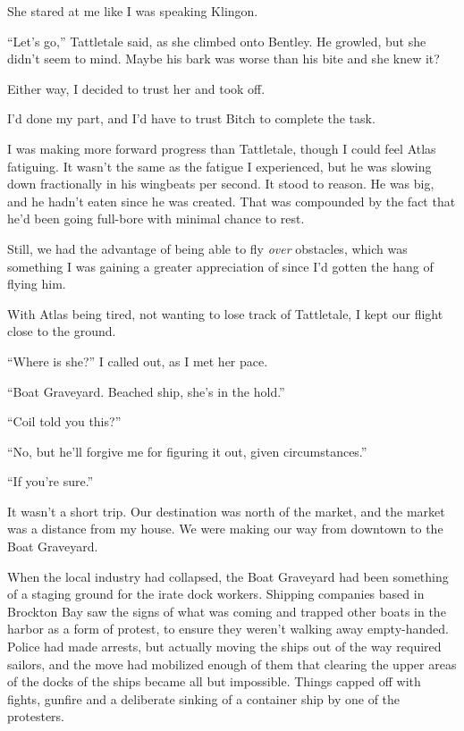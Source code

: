 She stared at me like I was speaking Klingon.



``Let's go,'' Tattletale said, as she climbed onto Bentley.  He growled, but she didn't seem to mind.  Maybe his bark was worse than his bite and she knew it?



Either way, I decided to trust her and took off.



I'd done my part, and I'd have to trust Bitch to complete the task.



I was making more forward progress than Tattletale, though I could feel Atlas fatiguing.  It wasn't the same as the fatigue I experienced, but he was slowing down fractionally in his wingbeats per second.  It stood to reason.  He was big, and he hadn't eaten since he was created.  That was compounded by the fact that he'd been going full-bore with minimal chance to rest.



Still, we had the advantage of being able to fly \emph{over} obstacles, which was something I was gaining a greater appreciation of since I'd gotten the hang of flying him.



With Atlas being tired, not wanting to lose track of Tattletale, I kept our flight close to the ground.



``Where is she?'' I called out, as I met her pace.



``Boat Graveyard.  Beached ship, she's in the hold.''



``Coil told you this?''



``No, but he'll forgive me for figuring it out, given circumstances.''



``If you're sure.''



It wasn't a short trip.  Our destination was north of the market, and the market was a distance from my house.  We were making our way from downtown to the Boat Graveyard.



When the local industry had collapsed, the Boat Graveyard had been something of a staging ground for the irate dock workers.  Shipping companies based in Brockton Bay saw the signs of what was coming and trapped other boats in the harbor as a form of protest, to ensure they weren't walking away empty-handed.  Police had made arrests, but actually moving the ships out of the way required sailors, and the move had mobilized enough of them that clearing the upper areas of the docks of the ships became all but impossible.  Things capped off with fights, gunfire and a deliberate sinking of a container ship by one of the protesters.



